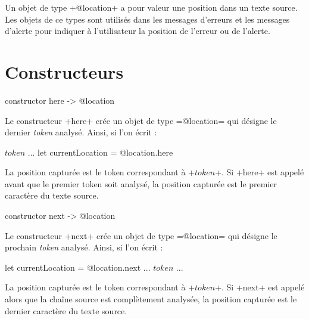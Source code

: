 

Un objet de type \ggs+@location+ a pour valeur une position dans un texte source. Les objets de ce types sont utilisés dans les messages d'erreurs et les messages d'alerte pour indiquer à l'utilisateur la position de l'erreur ou de l'alerte.











\section{Constructeurs}



\begin{galgas}
constructor here -> @location
\end{galgas}

Le constructeur \ggs+here+ crée un objet de type \ggs=@location= qui désigne le dernier \emph{token} analysé. Ainsi, si l'on écrit :

\begin{galgas}
  $token$
  ...
  let currentLocation = @location.here
\end{galgas}

La position capturée est le token correspondant à \ggs+$token$+. Si \ggs+here+ est appelé avant que le premier token soit analysé, la position capturée est le premier caractère du texte source.







\begin{galgas}
constructor next -> @location
\end{galgas}

Le constructeur \ggs+next+ crée un objet de type \ggs=@location= qui désigne le prochain \emph{token} analysé. Ainsi, si l'on écrit :

\begin{galgas}
  let currentLocation = @location.next
  ...
  $token$
  ...
\end{galgas}

La position capturée est le token correspondant à \ggs+$token$+. Si \ggs+next+ est appelé alors que la chaîne source est complètement analysée, la position capturée est le dernier caractère du texte source.






